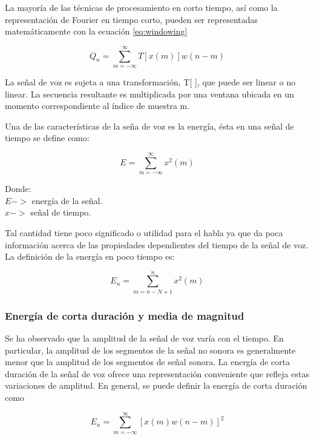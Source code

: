 La mayoría de las técnicas de procesamiento en corto tiempo, así como la representación de Fourier en tiempo corto, pueden ser representadas matemáticamente con la ecuación \ref{eq:windowing}

\begin{equation}\label{eq:windowing}
	Q_n=\sum_{m=-\infty}^{\infty}{T[x(m)]w(n-m)}
\end{equation}

La señal de voz es sujeta a una transformación, T[ ], que puede ser linear o no linear. La secuencia resultante es multiplicada por una ventana ubicada en un momento correspondiente al índice de muestra m. 

Una de las características de la seña de voz es la energía, ésta en una señal de tiempo se define como:

\begin{equation}\label{eq:windowing}
	E=\sum_{m=-\infty}^{\infty}{x^2(m)}
\end{equation}

Donde:
\\$E->$ energía de la señal.
\\$x->$ señal de tiempo.

Tal cantidad tiene poco significado o utilidad para el habla ya que da poca información acerca de las propiedades dependientes del tiempo de la señal de voz. La definición de la energía en poco tiempo es:

\begin{equation}\label{eq:windowing}
	E_n=\sum_{m=n-N+1}^{n}{x^2(m)}
\end{equation}

\subsubsection{Energía de corta duración y media de magnitud}

Se ha observado que la amplitud de la señal de voz varía con el tiempo. En particular, la amplitud de los segmentos de la señal no sonora es generalmente menor que la amplitud de los segmentos de señal sonora. La energía de corta duración de la señal de voz ofrece una representación conveniente que refleja estas variaciones de amplitud. En general, se puede definir la energía de corta duración como

\begin{equation}\label{eq:windowing}
	E_n=\sum_{m=-\infty}^{\infty}{[x(m)w(n-m)]^2}
\end{equation}

